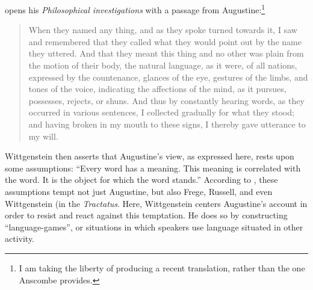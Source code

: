 \documentclass[man,12pt,natbib]{apa6}
\begin{document}
\citet{Wittgenstein53} opens his \emph{Philosophical investigations} with a
passage from Augustine:\footnote{I am taking the liberty of producing a recent
translation, rather than the one Anscombe provides.}
\begin{quote}
	When they named any thing, and as they spoke turned towards it, I saw and
	remembered that they called what they would point out by the name they
	uttered. And that they meant this thing and no other was plain from the
	motion of their body, the natural language, as it were, of all nations,
	expressed by the countenance, glances of the eye, gestures of the limbs,
	and tones of the voice, indicating the affections of the mind, as it
	pursues, possesses, rejects, or shuns. And thus by constantly hearing
	words, as they occurred in various sentences, I collected gradually for
	what they stood; and having broken in my mouth to these signs, I thereby
	gave utterance to my will. \cite[\S 1.8.13]{Pusey09}
\end{quote}
Wittgenstein then asserts that Augustine's view, as expressed here,
rests upon some assumptions: ``Every word has a meaning. This meaning is
correlated with the word. It is the object for which the word stands.''
According to \cite{McGinn97}, these assumptions tempt not just Augustine, but
also Frege, Russell, and even Wittgenstein (in the \emph{Tractatus}. 
Here, Wittgenstein centers 
Augustine's account in order to resist and react against
this temptation. He does so by constructing ``language-games'', or situations
in which speakers use language situated in other activity.
\end{document}
